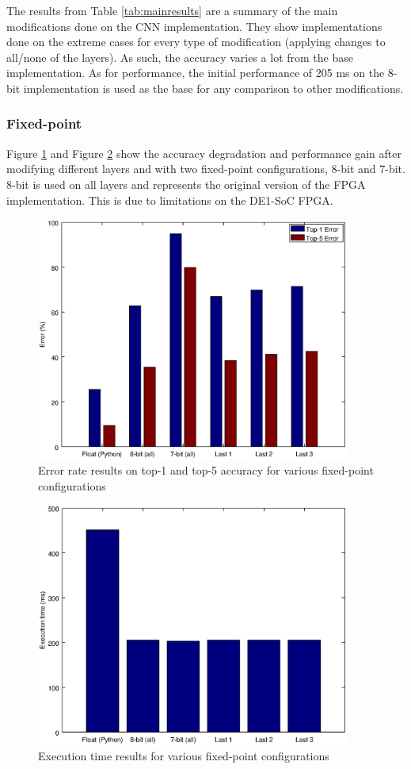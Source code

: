 \begin{enumerate}
The results from Table \ref{tab:mainresults} are a summary of the main modifications done
on the CNN implementation. They show implementations done on the extreme cases for every
type of modification (applying changes to all/none of the layers). As such, the accuracy
varies a lot from the base implementation. As for performance, the initial performance of
205 ms on the 8-bit implementation is used as the base for any comparison to other
modifications.

\subsubsection{Fixed-point}

Figure \ref{fig:fpaccuracy} and Figure \ref{fig:fpperformance} show the accuracy degradation 
and performance gain after
modifying different layers and with two fixed-point configurations, 8-bit and 7-bit.
8-bit is used on all layers and represents the original version of the FPGA implementation.
This is due to limitations on the DE1-SoC FPGA.

\begin{figure}[H]
    \centering
    \includegraphics[height=8cm]{fig/fpaccuracy.eps}
    \caption{Error rate results on top-1 and top-5 accuracy for various fixed-point configurations}
    \label{fig:fpaccuracy}
\end{figure}

\begin{figure}[H]
    \centering
    \includegraphics[height=8cm]{fig/fpperformance.eps}
    \caption{Execution time results for various fixed-point configurations}
    \label{fig:fpperformance}
\end{figure}


\end{enumerate}

